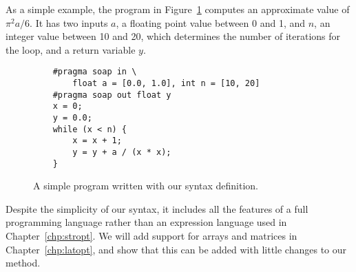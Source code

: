 As a simple example, the program in Figure~\ref{fig:syntax_example} computes an
approximate value of ${\pi^2 a}/6$.  It has two inputs $a$, a floating point
value between 0 and 1, and $n$, an integer value between 10 and 20, which
determines the number of iterations for the loop, and a return variable $y$.

\begin{figure}[ht]
    \begin{lstlisting}
    #pragma soap in \
        float a = [0.0, 1.0], int n = [10, 20]
    #pragma soap out float y
    x = 0;
    y = 0.0;
    while (x < n) {
        x = x + 1;
        y = y + a / (x * x);
    }
    \end{lstlisting}
    \caption{A simple program written with our syntax definition.}
    \label{fig:syntax_example}
\end{figure}

Despite the simplicity of our syntax, it includes all the features of
a full programming language rather than an expression language used in
Chapter~\ref{chp:stropt}.  We will add support for arrays and matrices in
Chapter~\ref{chp:latopt}, and show that this can be added with little changes
to our method.
